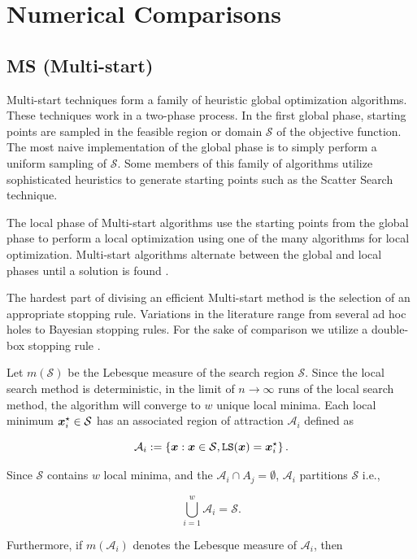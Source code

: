 \section{Numerical Comparisons}
\label{sec:num-comparisons}

\subsection{MS (Multi-start)}
\label{compare:ms}

Multi-start techniques form a family of heuristic global optimization algorithms. These techniques work in a two-phase
process. In the first global phase, starting points are sampled in the feasible region or domain $\mathcal{S}$ of the
objective function. The most naive implementation of the global phase is to simply perform a uniform sampling of $\mathcal{S}$.
Some members of this family of algorithms utilize sophisticated heuristics to generate starting points such as the
Scatter Search technique.

The local phase of Multi-start algorithms use the starting points from the global phase to perform a local optimization
using one of the many algorithms for local optimization. Multi-start algorithms alternate between the global and local
phases until a solution is found \cite{Ugray2007ScatterSA}.

The hardest part of divising an efficient Multi-start method is the selection of an appropriate stopping rule.
Variations in the literature range from several ad hoc holes to Bayesian stopping rules. For the sake of comparison
we utilize a double-box stopping rule \cite{lagaris}.

Let $m(\mathcal{S})$ be the Lebesque measure of the search region $\mathcal{S}$. Since the local search method is
deterministic, in the limit of $n\rightarrow \infty$ runs of the local search method, the algorithm will converge
to $w$ unique local minima. Each local minimum $\boldsymbol{x}_i^\star \in\mathcal{S}$ has an associated region of
attraction $\mathcal{A}_i$ defined as

$$
\mathcal{A}_i := \left\lbrace \boldsymbol{x} : \boldsymbol{x}\in\mathcal{S}, \texttt{LS}(\boldsymbol{x}) = \boldsymbol{x}_i^\star \right\rbrace.
$$

Since $\mathcal{S}$ contains $w$ local minima, and the $\mathcal{A}_i\cap A_j=\emptyset$, $\mathcal{A}_i$ partitions $\mathcal{S}$ i.e.,

$$
\bigcup_{i=1}^w \mathcal{A}_i = \mathcal{S}.
$$

Furthermore, if $m(\mathcal{A}_i)$ denotes the Lebesque measure of $\mathcal{A}_i$, then

